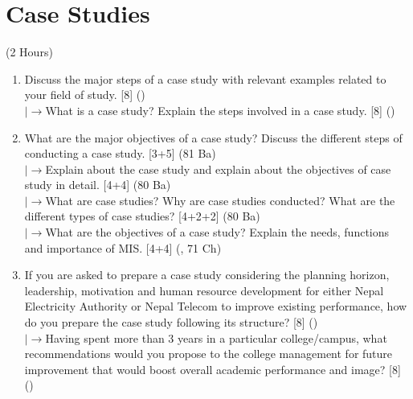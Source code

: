 \documentclass[12pt]{article}
\newcommand{\lb}{\\$\left|\rightarrow\right.$}
\begin{document}
\section{Case Studies}
\begin{center}(2 Hours)\end{center}
    \begin{enumerate}[topsep=0pt, noitemsep]
      \item Discuss the major steps of a case study with relevant examples related to your field of study. \hfill [8] ()
        \lb What is a case study? Explain the steps involved in a case study. \hfill [8] ()

      \item What are the major objectives of a case study? Discuss the different steps of conducting a case study. \hfill [3+5] (81 Ba)
        \lb Explain about the case study and explain about the objectives of case study in detail. \hfill [4+4] (80 Ba)
        \lb What are case studies? Why are case studies conducted? What are the different types of case studies? \hfill [4+2+2] (80 Ba)
        \lb What are the objectives of a case study? Explain the needs, functions and importance of MIS. \hfill [4+4] (, 71 Ch)

      \item If you are asked to prepare a case study considering the planning horizon, leadership, motivation and human resource development for either Nepal Electricity Authority or Nepal Telecom to improve existing performance, how do you prepare the case study following its structure? \hfill [8] ()
        \lb Having spent more than 3 years in a particular college/campus, what recommendations would you propose to the college management for future improvement that would boost overall academic performance and image? \hfill [8] ()
    \end{enumerate}

\pagebreak
\end{document}
